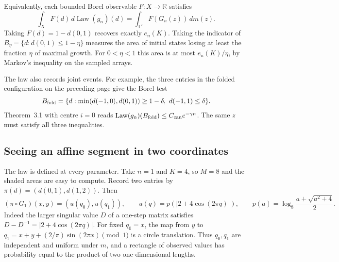 \documentclass[11pt,a4paper]{article}
\newcommand{\R}{\mathbb{R}}
\newcommand{\T}{\mathbb{T}}
\DeclareMathOperator{\Law}{Law}
\begin{document}
Equivalently, each bounded Borel observable $F:X\to\R$ satisfies
\[
 \int_X F(d)\,d\Law(g_n)(d)=\int_{\T^2}F(G_n(z))\,dm(z).
\]
Taking $F(d)=1-d(0,1)$ recovers exactly $e_n(K)$. Taking the indicator of
$B_\eta=\{d:d(0,1)\le1-\eta\}$ measures the area of initial states losing at least
the fraction $\eta$ of maximal growth. For $0<\eta<1$ this area is at most
$e_n(K)/\eta$, by Markov's inequality on the sampled arrays.

The law also records joint events. For example, the three entries in the
folded configuration on the preceding page give the Borel test
\[
 B_{\rm fold}=\{d:\min(d(-1,0),d(0,1))\ge1-\delta,\ d(-1,1)\le\delta\}.
\]
Theorem~3.1 with centre $i=0$ reads $\Law(g_n)(B_{\rm fold})\le
C_{\rm can}e^{-\gamma n}$. The same $z$ must satisfy all three inequalities.

\newpage
\subsection*{Seeing an affine segment in two coordinates}
The law is defined at every parameter. Take $n=1$ and $K=4$, so $M=8$ and the
shaded areas are easy to compute. Record two entries by $\pi(d)=(d(0,1),d(1,2))$. Then
\[
 (\pi\circ G_1)(x,y)=(u(q_0),u(q_1)),\qquad
 u(q)=p(|2+4\cos(2\pi q)|),\qquad p(a)=\log_8\frac{a+\sqrt{a^2+4}}2 .
\]
Indeed the larger singular value $D$ of a one-step matrix satisfies
$D-D^{-1}=|2+4\cos(2\pi q)|$. For fixed $q_0=x$, the map from $y$ to
$q_1=x+y+(2/\pi)\sin(2\pi x)\pmod1$ is a circle translation. Thus $q_0,q_1$
are independent and uniform under $m$, and a rectangle of observed values
has probability equal to the product of two one-dimensional lengths.
\end{document}
